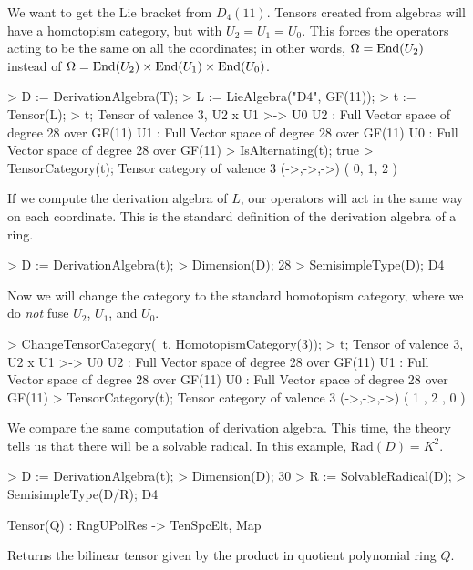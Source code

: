 \begin{example}[D4LieAlgebra]

We want to get the Lie bracket from $D_4(11)$. Tensors created from algebras
will have a homotopism category, but with $U_2=U_1=U_0$. This forces the
operators acting to be the same on all the coordinates; in other words,
$\Omega=\operatorname{End}(U_2)$ instead of $\Omega=\operatorname{End}(U_2)\times\operatorname{End}(U_1)\times\operatorname{End}(U_0)$. 
\begin{code}
> D := DerivationAlgebra(T);
> L := LieAlgebra("D4", GF(11));
> t := Tensor(L);
> t;
Tensor of valence 3, U2 x U1 >-> U0
U2 : Full Vector space of degree 28 over GF(11)
U1 : Full Vector space of degree 28 over GF(11)
U0 : Full Vector space of degree 28 over GF(11)
> IsAlternating(t);
true
> TensorCategory(t);
Tensor category of valence 3 (->,->,->) ({ 0, 1, 2 })
\end{code}

If we compute the derivation algebra of $L$, our operators will act in the same
way on each coordinate. This is the standard definition of the derivation
algebra of a ring.
\begin{code}
> D := DerivationAlgebra(t);
> Dimension(D);
28
> SemisimpleType(D);
D4
\end{code}

Now we will change the category to the standard homotopism category, where we do
\emph{not} fuse $U_2$, $U_1$, and $U_0$. 
\begin{code}
> ChangeTensorCategory(~t, HomotopismCategory(3));
> t;
Tensor of valence 3, U2 x U1 >-> U0
U2 : Full Vector space of degree 28 over GF(11)
U1 : Full Vector space of degree 28 over GF(11)
U0 : Full Vector space of degree 28 over GF(11)
> TensorCategory(t);
Tensor category of valence 3 (->,->,->) ({ 1 },{ 2 },{ 0 })
\end{code}

We compare the same computation of derivation algebra. This time, the theory
tells us that there will be a solvable radical. In this example, Rad$(D)=K^2$. 
\begin{code}
> D := DerivationAlgebra(t);
> Dimension(D);
30
> R := SolvableRadical(D);
> SemisimpleType(D/R);
D4
\end{code}
\end{example}

\begin{intrinsics}
Tensor(Q) : RngUPolRes -> TenSpcElt, Map
\end{intrinsics}

Returns the bilinear tensor given by the product in quotient polynomial ring $Q$.

